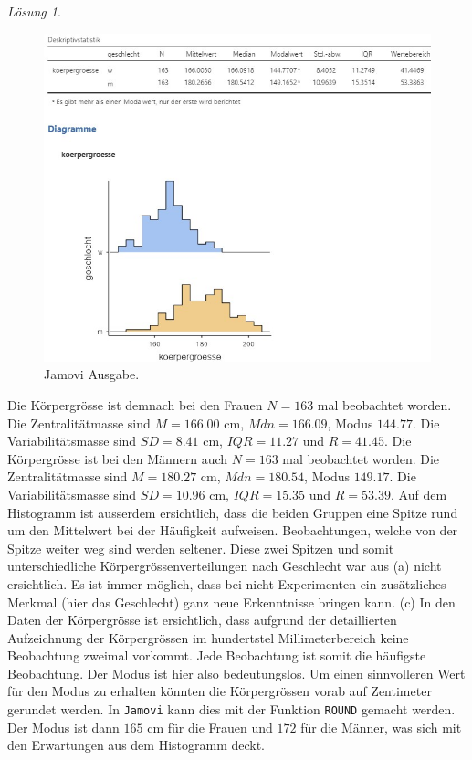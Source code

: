\documentclass[
]{book}
\theoremstyle{definition}
\theoremstyle{definition}
\theoremstyle{definition}
\theoremstyle{definition}
\theoremstyle{remark}
\newtheorem*{solution}{Lösung}
\begin{document}
\begin{solution}
\begin{figure}
\includegraphics[width=1\linewidth]{figures/02-exr-koerpergroesse-sex-jmv-output-b} \caption{Jamovi Ausgabe.}\label{fig:sol-koerpergroesse-sex-output-b}
\end{figure}

Die Körpergrösse ist demnach bei den Frauen \(N=163\) mal beobachtet worden. Die Zentralitätmasse sind \(M=166.00\) cm, \(Mdn=166.09\), Modus \(144.77\). Die Variabilitätsmasse sind \(SD=8.41\) cm, \(IQR=11.27\) und \(R=41.45\). Die Körpergrösse ist bei den Männern auch \(N=163\) mal beobachtet worden. Die Zentralitätmasse sind \(M=180.27\) cm, \(Mdn=180.54\), Modus \(149.17\). Die Variabilitätsmasse sind \(SD=10.96\) cm, \(IQR=15.35\) und \(R=53.39\). Auf dem Histogramm ist ausserdem ersichtlich, dass die beiden Gruppen eine Spitze rund um den Mittelwert bei der Häufigkeit aufweisen. Beobachtungen, welche von der Spitze weiter weg sind werden seltener. Diese zwei Spitzen und somit unterschiedliche Körpergrössenverteilungen nach Geschlecht war aus (a) nicht ersichtlich. Es ist immer möglich, dass bei nicht-Experimenten ein zusätzliches Merkmal (hier das Geschlecht) ganz neue Erkenntnisse bringen kann.
(c) In den Daten der Körpergrösse ist ersichtlich, dass aufgrund der detaillierten Aufzeichnung der Körpergrössen im hundertstel Millimeterbereich keine Beobachtung zweimal vorkommt. Jede Beobachtung ist somit die häufigste Beobachtung. Der Modus ist hier also bedeutungslos. Um einen sinnvolleren Wert für den Modus zu erhalten könnten die Körpergrössen vorab auf Zentimeter gerundet werden. In \texttt{Jamovi} kann dies mit der Funktion \texttt{ROUND} gemacht werden. Der Modus ist dann \(165\) cm für die Frauen und \(172\) für die Männer, was sich mit den Erwartungen aus dem Histogramm deckt.

\end{solution}
\end{document}
